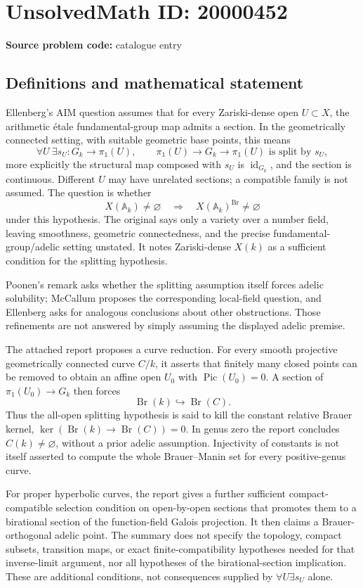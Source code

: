 \documentclass[11pt]{article}
\begin{document}
\section*{UnsolvedMath ID: 20000452}
\textbf{Source problem code:} catalogue entry
\subsection{Definitions and mathematical statement}
Ellenberg's AIM question assumes that for every Zariski-dense open \(U\subset X\), the arithmetic \'etale fundamental-group map admits a section. In the geometrically connected setting, with suitable geometric base points, this means
\[
\forall U\ \exists s_U:G_k\to\pi_1(U),\qquad
\pi_1(U)\to G_k\to\pi_1(U)\text{ is split by }s_U,
\]
more explicitly the structural map composed with \(s_U\) is \(\operatorname{id}_{G_k}\), and the section is continuous. Different \(U\) may have unrelated sections; a compatible family is not assumed. The question is whether
\[
X(\mathbb A_k)\ne\varnothing\quad\Longrightarrow\quad
X(\mathbb A_k)^{\operatorname{Br}}\ne\varnothing
\]
under this hypothesis. The original says only a variety over a number field, leaving smoothness, geometric connectedness, and the precise fundamental-group/adelic setting unstated. It notes Zariski-dense \(X(k)\) as a sufficient condition for the splitting hypothesis.

Poonen's remark asks whether the splitting assumption itself forces adelic solubility; McCallum proposes the corresponding local-field question, and Ellenberg asks for analogous conclusions about other obstructions. Those refinements are not answered by simply assuming the displayed adelic premise.

The attached report proposes a curve reduction. For every smooth projective geometrically connected curve \(C/k\), it asserts that finitely many closed points can be removed to obtain an affine open \(U_0\) with \(\operatorname{Pic}(U_0)=0\). A section of \(\pi_1(U_0)\to G_k\) then forces
\[
\operatorname{Br}(k)\hookrightarrow\operatorname{Br}(C).
\]
Thus the all-open splitting hypothesis is said to kill the constant relative Brauer kernel, \(\ker(\operatorname{Br}(k)\to\operatorname{Br}(C))=0\). In genus zero the report concludes \(C(k)\ne\varnothing\), without a prior adelic assumption. Injectivity of constants is not itself asserted to compute the whole Brauer--Manin set for every positive-genus curve.

For proper hyperbolic curves, the report gives a further sufficient compact-compatible selection condition on open-by-open sections that promotes them to a birational section of the function-field Galois projection. It then claims a Brauer-orthogonal adelic point. The summary does not specify the topology, compact subsets, transition maps, or exact finite-compatibility hypotheses needed for that inverse-limit argument, nor all hypotheses of the birational-section implication. These are additional conditions, not consequences supplied by \(\forall U\exists s_U\) alone.
\end{document}
